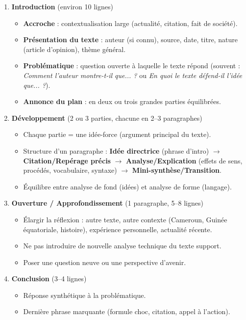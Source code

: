 \documentclass[11pt]{article}
\begin{document}
\begin{methode}
\begin{enumerate}
\item \textbf{Introduction} (environ 10 lignes)
      \begin{itemize}
      \item \textbf{Accroche} : contextualisation large (actualité, citation, fait de société).
      \item \textbf{Présentation du texte} : auteur (si connu), source, date, titre, nature (article d'opinion), thème général.
      \item \textbf{Problématique} : question ouverte à laquelle le texte répond (souvent : \emph{Comment l'auteur montre-t-il que... ?} ou \emph{En quoi le texte défend-il l'idée que... ?}).
      \item \textbf{Annonce du plan} : en deux ou trois grandes parties équilibrées.
      \end{itemize}
\item \textbf{Développement} (2 ou 3 parties, chacune en 2--3 paragraphes)
      \begin{itemize}
      \item Chaque partie = une idée-force (argument principal du texte).
      \item Structure d'un paragraphe : \textbf{Idée directrice} (phrase d'intro) $\rightarrow$ \textbf{Citation/Repérage précis} $\rightarrow$ \textbf{Analyse/Explication} (effets de sens, procédés, vocabulaire, syntaxe) $\rightarrow$ \textbf{Mini-synthèse/Transition}.
      \item Équilibre entre analyse de fond (idées) et analyse de forme (langage).
      \end{itemize}
\item \textbf{Ouverture / Approfondissement} (1 paragraphe, 5--8 lignes)
      \begin{itemize}
      \item Élargir la réflexion : autre texte, autre contexte (Cameroun, Guinée équatoriale, histoire), expérience personnelle, actualité récente.
      \item Ne pas introduire de nouvelle analyse technique du texte support.
      \item Poser une question neuve ou une perspective d'avenir.
      \end{itemize}
\item \textbf{Conclusion} (3--4 lignes)
      \begin{itemize}
      \item Réponse synthétique à la problématique.
      \item Dernière phrase marquante (formule choc, citation, appel à l'action).
      \end{itemize}
\end{enumerate}
\end{methode}
\end{document}
